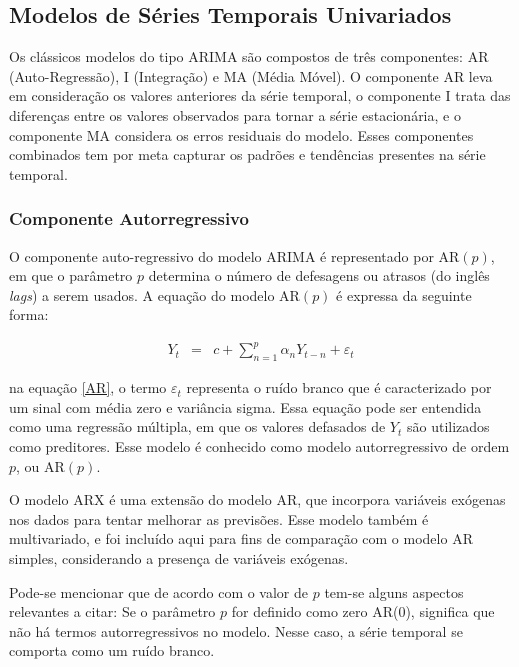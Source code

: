  \subsection{Modelos de S\'eries Temporais Univariados}\label{subsec:arima}
 
 
 Os clássicos modelos do tipo ARIMA são compostos de três componentes: AR (Auto-Regressão), I (Integração) e MA (Média Móvel). O componente AR leva em consideração os valores anteriores da série temporal, o componente I trata das diferenças entre os valores observados para tornar a série estacionária, e o componente MA considera os erros residuais do modelo. Esses componentes combinados  tem por meta capturar os padrões e tendências presentes na série temporal.
 
 \subsubsection{Componente Autorregressivo}
 
 O componente auto-regressivo do modelo ARIMA é representado por AR$(p)$, em que o parâmetro $p$ determina o número de defesagens ou atrasos (do inglês \textit{lags}) a serem usados.
 A equação do modelo AR$(p)$ é expressa da seguinte forma:
 
 \begin{eqnarray}
 	Y_t&=&c+\sum_{n=1}^{p} \alpha_n Y_{t-n} + \varepsilon_t\label{AR}
 \end{eqnarray}
 
 
 \noindent na equação \eqref{AR}, o termo $\varepsilon_t$ representa o ruído branco que é caracterizado por um sinal com média zero e variância sigma. Essa equação pode ser entendida como uma regressão múltipla, em que os valores defasados de $Y_t$ são utilizados como preditores. Esse modelo é conhecido como modelo autorregressivo de ordem $p$, ou AR$(p)$.
 
 
 O modelo ARX é uma extensão do modelo AR, que incorpora variáveis exógenas nos dados para tentar melhorar as previsões. Esse modelo também é multivariado, e foi incluído aqui para fins de comparação com o modelo AR simples, considerando a presença de variáveis exógenas.
 
 
 Pode-se mencionar que de acordo com o valor de $p$ tem-se alguns aspectos relevantes a citar:
 Se o parâmetro $p$ for definido como zero AR($0$), significa que não há termos autorregressivos no modelo. Nesse caso, a série temporal se comporta como um ruído branco. 
 
 
 
